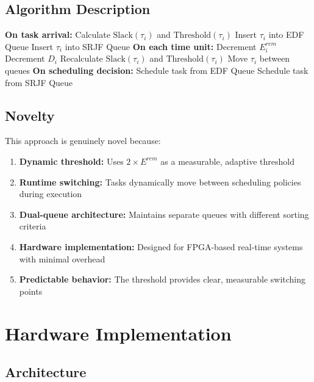 \documentclass[conference]{IEEEtran}
\begin{document}
\subsection{Algorithm Description}

\begin{algorithmic}
\STATE \textbf{On task arrival:}
\STATE Calculate $\text{Slack}(\tau_i)$ and $\text{Threshold}(\tau_i)$
    \STATE Insert $\tau_i$ into EDF Queue
\ELSE
    \STATE Insert $\tau_i$ into SRJF Queue
\ENDIF
\STATE
\STATE \textbf{On each time unit:}
    \STATE Decrement $E_i^{rem}$
    \STATE Decrement $D_i$
    \STATE Recalculate $\text{Slack}(\tau_i)$ and $\text{Threshold}(\tau_i)$
        \STATE Move $\tau_i$ between queues
    \ENDIF
\ENDFOR
\STATE
\STATE \textbf{On scheduling decision:}
    \STATE Schedule task from EDF Queue
\ELSE
    \STATE Schedule task from SRJF Queue
\ENDIF
\end{algorithmic}

\subsection{Novelty}

This approach is genuinely novel because:

\begin{enumerate}
    \item \textbf{Dynamic threshold:} Uses $2 \times E^{rem}$ as a measurable, adaptive threshold
    \item \textbf{Runtime switching:} Tasks dynamically move between scheduling policies during execution
    \item \textbf{Dual-queue architecture:} Maintains separate queues with different sorting criteria
    \item \textbf{Hardware implementation:} Designed for FPGA-based real-time systems with minimal overhead
    \item \textbf{Predictable behavior:} The threshold provides clear, measurable switching points
\end{enumerate}

\section{Hardware Implementation}

\subsection{Architecture}
\end{document}

